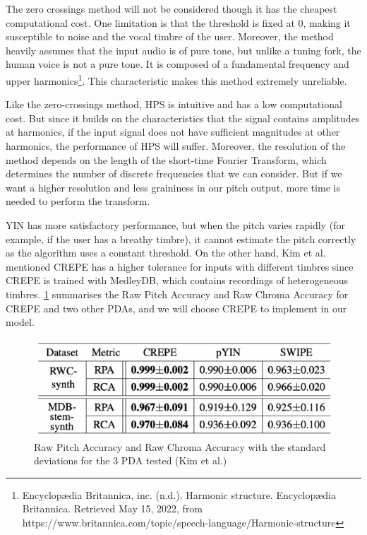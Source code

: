 The zero crossings method will not be considered though it has the cheapest computational cost. One limitation is that
the threshold is fixed at 0, making it susceptible to noise and the vocal timbre of the user. Moreover, the method heavily assumes that the input audio is of pure tone, but unlike a tuning fork, the human voice is not a pure tone. It is 
composed of a fundamental frequency and upper harmonics\footnote{Encyclopædia Britannica, inc. (n.d.). Harmonic structure. Encyclopædia Britannica. Retrieved May 15, 2022, from https://www.britannica.com/topic/speech-language/Harmonic-structure }.  
This characteristic makes this method extremely unreliable.

Like the zero-crossings method, HPS is intuitive and has a low computational cost. But since it builds on the characteristics 
that the signal contains amplitudes at harmonics, if the input signal does not have sufficient magnitudes at other harmonics, the 
performance of HPS will suffer. Moreover, the resolution of the method depends on the length of the short-time Fourier Transform, which
determines the number of discrete frequencies that we can consider. But if we want a higher resolution and less graininess in our 
pitch output, more time is needed to perform the transform.

YIN has more satisfactory performance, but when the pitch varies rapidly (for example, if the user has a breathy timbre), it cannot 
estimate the pitch correctly as the algorithm uses a constant threshold. On the other hand, Kim et al. mentioned CREPE has a higher 
tolerance for inputs with different timbres since CREPE is trained with MedleyDB, which contains recordings of heterogeneous timbres. 
\cref{CREPEperf} summarises the Raw Pitch Accuracy and Raw Chroma Accuracy for CREPE and two other PDAs, and we will choose CREPE 
to implement in our model.

\begin{figure}[h]
	\centering
	\includegraphics[width=0.8\columnwidth]{Figures/CREPEperf.png}
	\caption{Raw Pitch Accuracy and Raw Chroma Accuracy with the standard deviations for the 3 PDA tested (Kim et al.)}
	\label{CREPEperf}
\end{figure}

